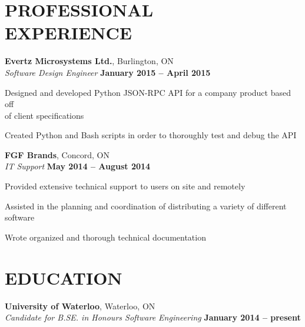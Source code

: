 \documentclass[margin,line]{resume}
\begin{document}
\begin{resume}
\sectionline\vspace{1mm}

    \section{\mysidestyle \textbf{\large{P}\small{ROFESSIONAL\\EXPERIENCE}}}

    \textbf{\listing Evertz Microsystems Ltd.}, Burlington, ON \vspace{2mm}\\\vspace{1mm}%
    \textsl{Software Design Engineer} \hfill \textbf{January 2015 -- April 2015}
    \begin{list2}
        \item  Designed and developed Python JSON-RPC API for a company product based off\\ of client specifications
        \item Created Python and Bash scripts in order to thoroughly test and debug the API
        \end{list2}
    \textbf{\listing FGF Brands}, Concord, ON \vspace{2mm}\\\vspace{1mm}%
    \textsl{IT Support} \hfill \textbf{May 2014 -- August 2014}
    \begin{list2}
        \item  Provided extensive technical support to users on site and remotely
        \item Assisted in the planning and coordination of distributing a variety of different software
        \item Wrote organized and thorough technical documentation
        \end{list2}
\sectionline\vspace{1mm}

    \section{\mysidestyle \textbf{\large{E}\small{DUCATION}}}

    \textbf{\listing University of Waterloo}, Waterloo, ON \vspace{2mm}\\\vspace{1mm}%
    \textsl{Candidate for B.SE. in Honours Software Engineering} \hfill \textbf{ January 2014 -- present}\vspace{-3mm}\\\vspace{-1mm}%


\end{resume}
\end{document}
